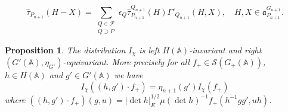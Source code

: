 \documentclass[10pt,a4paper]{amsart}
\newtheorem{prop}{Proposition}
\providecommand{\abs}[1]{\lvert#1\rvert}
\newcommand{\bA}{\mathbb{A}}
\newcommand{\cF}{\mathcal{F}}
\newcommand{\cS}{\mathcal{S}}
\newcommand{\fa}{\mathfrak{a}}
\begin{document}
    \begin{equation}    \label{eq:Gamma_Q'}
    \widehat{\tau}_{P_{n+1}}(H-X) = \sum_{ \substack{ Q \in \cF \\ Q \supset P }}
    \epsilon_{Q} \widehat{\tau}_{P_{n+1}}^{Q_{n+1}}(H)
    \Gamma'_{Q_{n+1}}(H, X), \quad H, X \in \fa_{P_{n+1}}^{G_{n+1}}.
    \end{equation}

\begin{prop}    \label{prop:invariant_I_chi}
The distribution $I_\chi$ is left $H(\bA)$-invariant and right
$(G'(\bA),\eta_{G'})$-equivariant. More precisely for all $f_+ \in
\cS(G_+(\bA))$, $h \in H(\bA)$ and $g' \in G'(\bA)$ we have
    \[
    I_\chi((h, g') \cdot f_+)= \eta_{n+1}(g') I_\chi(f_+)
    \]
where $((h, g') \cdot f_+)(g,u)=\abs{\det h}_E^{1/2} \mu(\det h)^{-1}
f_+(h^{-1} g g',uh)$.
\end{prop}
\end{document}
